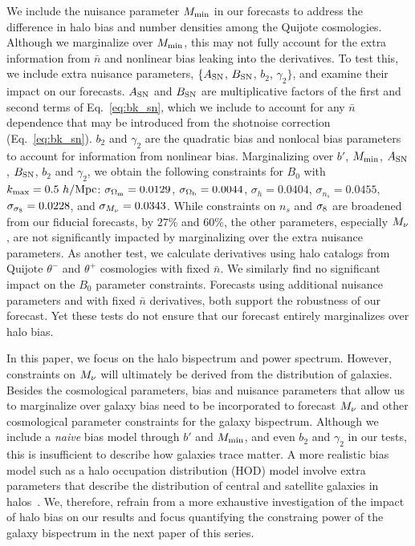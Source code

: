 We include the nuisance parameter $M_{\rm min}$ in our forecasts to address the 
difference in halo bias and number densities among the Quijote cosmologies. Although 
we marginalize over $M_{\rm min}$, this may not fully account for the extra 
information from $\bar{n}$ and nonlinear bias leaking into the derivatives. 
To test this, we include extra nuisance parameters, $\{A_{\rm SN}$, 
$B_{\rm SN}$, $b_2$, $\gamma_2\}$, and examine their impact on our forecasts. 
$A_{\rm SN}$ and $B_{\rm SN}$ are multiplicative factors of the first and
second terms of Eq.~\ref{eq:bk_sn}, which we include to account for any 
$\bar{n}$ dependence that may be introduced from the shotnoise correction 
(Eq.~\ref{eq:bk_sn}). $b_2$ and $\gamma_2$ are the quadratic bias and nonlocal bias 
parameters~\citep{chan2012, sheth2013} to account for information from 
nonlinear bias. Marginalizing over $b'$, $M_{\rm min}$, $A_{\rm SN}$, $B_{\rm SN}$, 
$b_2$ and $\gamma_2$, we obtain the following constraints for $B_0$ 
with $k_{\rm max} = 0.5~h/{\rm Mpc}$:
$\sigma_{\Omega_{\rm m}} = 0.0129$, $\sigma_{\Omega_{\rm b}} = 0.0044$, $\sigma_h=0.0404$, 
$\sigma_{n_s}=0.0455$, $\sigma_{\sigma_8}=0.0228$, and $\sigma_{M_\nu}=0.0343$. 
While constraints on $n_s$ and $\sigma_8$ are broadened from our fiducial 
forecasts, by $27\%$ and $60\%$, the other parameters, especially $M_\nu$, 
are not significantly impacted by marginalizing over the extra nuisance 
parameters. As another test, we calculate derivatives using halo catalogs 
from Quijote $\theta^{-}$ and $\theta^{+}$ cosmologies with fixed $\bar{n}$. 
We similarly find no significant impact on the $B_0$ parameter constraints.
Forecasts using additional nuisance parameters and with fixed $\bar{n}$ 
derivatives, both support the robustness of our forecast. Yet these 
tests do not ensure that our forecast entirely marginalizes over halo bias. 

In this paper, we focus on the halo bispectrum and power spectrum. However,   
constraints on $M_\nu$ will ultimately be derived from the distribution of 
galaxies. Besides the cosmological parameters, bias and nuisance parameters 
that allow us to marginalize over galaxy bias need to be incorporated to 
forecast $M_\nu$ and other cosmological parameter constraints for the 
galaxy bispectrum. Although we include a \emph{naive} bias model through $b'$ 
and $M_{\rm min}$, and even $b_2$ and $\gamma_2$ in our tests, this is 
insufficient to describe how galaxies trace matter. A more realistic bias model 
such as a halo occupation distribution (HOD) model involve extra parameters 
that describe the distribution of central and satellite galaxies in 
halos~\citep[\emph{e.g.}][]{zheng2005,leauthaud2012,tinker2013,zentner2016,vakili2019}. 
We, therefore, refrain from a more exhaustive investigation of the impact of 
halo bias on our results and focus quantifying the constraing power of 
the galaxy bispectrum in the next paper of this series. 

